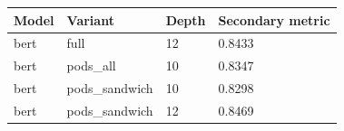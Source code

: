\begin{tabular}{llll}
\hline
Model & Variant & Depth & Secondary metric \\
\hline
bert & full & 12 & 0.8433 \\
bert & pods\_all & 10 & 0.8347 \\
bert & pods\_sandwich & 10 & 0.8298 \\
bert & pods\_sandwich & 12 & 0.8469 \\
\hline
\end{tabular}

